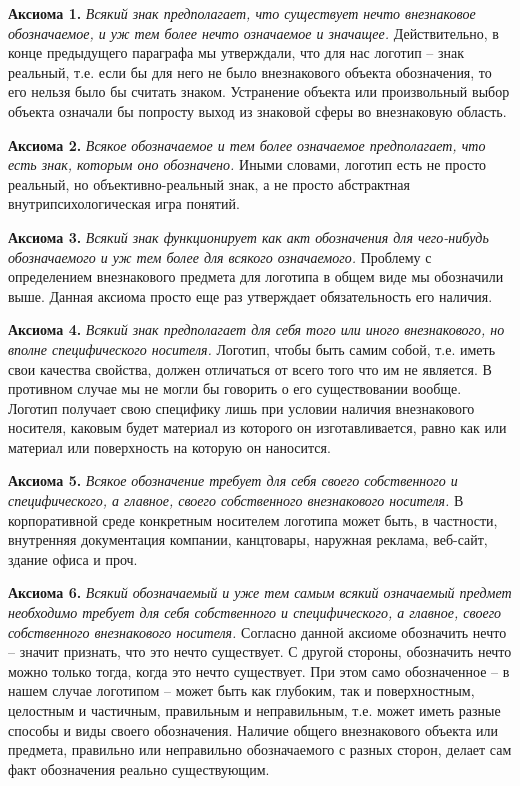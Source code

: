 \textbf{Аксиома 1.} \emph{Всякий знак предполагает, что существует нечто внезнаковое
    обозначаемое, и уж тем более нечто означаемое и значащее.} Действительно,
  в конце предыдущего параграфа мы утверждали, что для нас логотип -- знак
  реальный, т.е. если бы для него не было внезнакового объекта обозначения,
  то его нельзя было бы считать знаком. Устранение объекта или произвольный
  выбор объекта означали бы попросту выход из знаковой сферы во внезнаковую
  область.

\textbf{Аксиома 2.} \emph{Всякое обозначаемое и тем более означаемое предполагает,
    что есть знак, которым оно обозначено.} Иными словами, логотип есть не просто
  реальный, но объективно-реальный знак, а не просто абстрактная
  внутрипсихологическая игра понятий.

\textbf{Аксиома 3.} \emph{Всякий знак функционирует как акт обозначения для
    чего-нибудь обозначаемого и уж тем более для всякого означаемого.}
  Проблему с определением внезнакового предмета для логотипа в общем виде
  мы обозначили выше. Данная аксиома просто еще раз утверждает обязательность
  его наличия.

\textbf{Аксиома 4.} \emph{Всякий знак предполагает для себя того или иного
    внезнакового, но вполне специфического носителя.} Логотип, чтобы быть
  самим собой, т.е. иметь свои качества свойства, должен отличаться
  от всего того что им не является. В противном случае мы не могли бы
  говорить о его существовании вообще. Логотип получает свою специфику
  лишь при условии наличия внезнакового носителя, каковым будет
  материал из которого он изготавливается, равно как или материал или
  поверхность на которую он наносится.

\textbf{Аксиома 5.} \emph{Всякое обозначение требует для себя своего
    собственного и специфического, а главное, своего собственного внезнакового
    носителя.} В корпоративной среде конкретным носителем логотипа может быть,
  в частности, внутренняя документация компании, канцтовары,
  наружная реклама, веб-сайт, здание офиса и проч.

\textbf{Аксиома 6.} \emph{Всякий обозначаемый и уже тем самым всякий означаемый
    предмет необходимо требует для себя собственного и специфического, а
    главное, своего собственного внезнакового носителя.}
  Согласно данной аксиоме обозначить нечто -- значит признать, что это
  нечто существует. С другой стороны, обозначить нечто можно только тогда,
  когда это нечто существует. При этом само обозначенное -- в нашем случае
  логотипом -- может быть как глубоким, так и поверхностным, целостным и
  частичным, правильным и неправильным, т.е. может иметь разные способы и
  виды своего обозначения. Наличие общего внезнакового объекта или предмета,
  правильно или неправильно обозначаемого с разных сторон, делает сам
  факт обозначения реально существующим.

